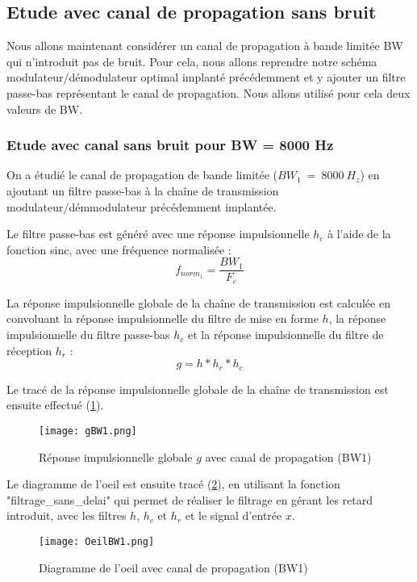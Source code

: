 \documentclass[11pt]{article}
\begin{document}
    \subsection{Etude avec canal de propagation sans bruit}

Nous allons maintenant considérer un canal de propagation à bande limitée BW qui n'introduit pas de bruit. Pour cela, nous allons reprendre notre schéma modulateur/démodulateur optimal implanté précédemment et y ajouter un filtre passe-bas représentant le canal de propagation.
Nous allons utilisé pour cela deux valeurs de BW.
    \subsubsection{Etude avec canal sans bruit pour BW = 8000 Hz}

    On a étudié le canal de propagation de bande limitée ($BW_1 \ = \ 8000 \ H_z$) en ajoutant un filtre passe-bas à la chaîne de transmission modulateur/démmodulateur précédemment implantée.

Le filtre passe-bas est généré avec une réponse impulsionnelle $h_c$ à l'aide de la fonction sinc, avec une fréquence normalisée :
$$f_{norm_1} = \frac{BW_1}{F_e}$$

La réponse impulsionnelle globale de la chaîne de transmission est calculée en convoluant la réponse impulsionnelle du filtre de mise en forme $h$, la réponse impulsionnelle du filtre passe-bas $h_c$ et la réponse impulsionnelle du filtre de réception $h_r$ :
$$ g = h * h_r *h_c$$

Le tracé de la réponse impulsionnelle globale de la chaîne de transmission est ensuite effectué (\ref{fig : gBW1}).

\begin{figure}[ht!]
            \centering
            \texttt{[image: gBW1.png]}
            \caption{Réponse impulsionnelle globale $g$ avec canal de propagation (BW1)\label{fig : gBW1}}
\end{figure}

Le diagramme de l'oeil est ensuite tracé (\ref{fig : OeilBW1}), en utilisant la fonction "filtrage\_sans\_delai" qui permet de réaliser le filtrage en gérant les retard introduit, avec les filtres $h$, $h_c$ et $h_r$ et le signal d'entrée $x$.

\begin{figure}[ht!]
            \centering
            \texttt{[image: OeilBW1.png]}
            \caption{Diagramme de l'oeil avec canal de propagation (BW1)\label{fig : OeilBW1}}
\end{figure}
\end{document}
